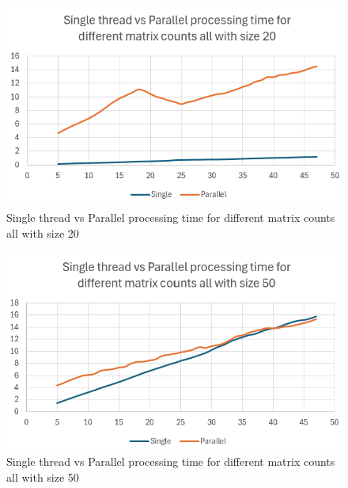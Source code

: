 \begin{figure}[H]
    \centering
    \includegraphics[width=1\columnwidth]{Figures/different_matrix_counts_size 20}
    \caption{Single thread vs Parallel processing time for different matrix counts all with size 20}
    \label{fig:different_matrix_counts_size_20}
\end{figure}

\begin{figure}[H]
    \centering
    \includegraphics[width=1\columnwidth]{Figures/different_matrix_counts_size 50}
    \caption{Single thread vs Parallel processing time for different matrix counts all with size 50}
    \label{fig:different_matrix_counts_size_50}
\end{figure}

